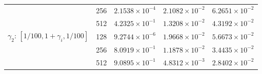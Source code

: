 \documentclass[11pt,a4paper]{article}
\begin{document}
\begin{table}[htbp]
\begin{tabular}{@{} l c c c c @{}}
                            & 256 & $2.1538 \times 10^{-4}$ & $2.1082 \times 10^{-2}$ & $6.2651 \times 10^{-2}$ \\
                            & 512 & $4.2325 \times 10^{-1}$ & $1.3208 \times 10^{-2}$ & $4.3192 \times 10^{-2}$ \\
        \midrule
        $\gamma_2$: $[1/100, 1+\gamma_i, 1/100]$ & 128 & $9.2744 \times 10^{-6}$ & $1.9668 \times 10^{-2}$ & $5.6673 \times 10^{-2}$ \\
                            & 256 & $8.0919 \times 10^{-1}$ & $1.1878 \times 10^{-2}$ & $3.4435 \times 10^{-2}$ \\
                            & 512 & $9.0895 \times 10^{-1}$ & $4.8312 \times 10^{-3}$ & $2.8402 \times 10^{-2}$ \\
        \bottomrule
    \end{tabular}
\end{table}
\end{document}
